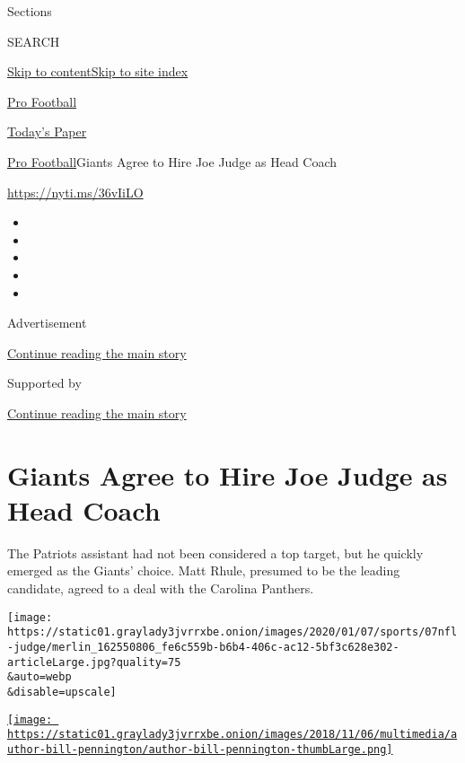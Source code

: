 Sections

SEARCH

\protect\hyperlink{site-content}{Skip to
content}\protect\hyperlink{site-index}{Skip to site index}

\href{https://www.nytimes3xbfgragh.onion/section/sports/football}{Pro
Football}

\href{https://myaccount.nytimes3xbfgragh.onion/auth/login?response_type=cookie\&client_id=vi}{}

\href{https://www.nytimes3xbfgragh.onion/section/todayspaper}{Today's
Paper}

\href{/section/sports/football}{Pro Football}\textbar{}Giants Agree to
Hire Joe Judge as Head Coach

\url{https://nyti.ms/36vIiLO}

\begin{itemize}
\item
\item
\item
\item
\item
\end{itemize}

Advertisement

\protect\hyperlink{after-top}{Continue reading the main story}

Supported by

\protect\hyperlink{after-sponsor}{Continue reading the main story}

\hypertarget{giants-agree-to-hire-joe-judge-as-head-coach}{%
\section{Giants Agree to Hire Joe Judge as Head
Coach}\label{giants-agree-to-hire-joe-judge-as-head-coach}}

The Patriots assistant had not been considered a top target, but he
quickly emerged as the Giants' choice. Matt Rhule, presumed to be the
leading candidate, agreed to a deal with the Carolina Panthers.

\texttt{[image: https://static01.graylady3jvrrxbe.onion/images/2020/01/07/sports/07nfl-judge/merlin\_162550806\_fe6c559b-b6b4-406c-ac12-5bf3c628e302-articleLarge.jpg?quality=75\\\&auto=webp\\\&disable=upscale]}

\href{https://www.nytimes3xbfgragh.onion/by/bill-pennington}{\texttt{[image: https://static01.graylady3jvrrxbe.onion/images/2018/11/06/multimedia/author-bill-pennington/author-bill-pennington-thumbLarge.png]}}

